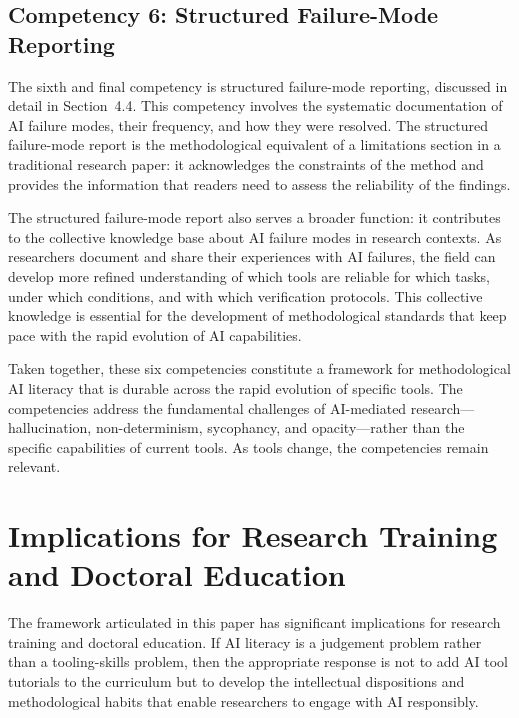 \documentclass[12pt, a4paper]{article}
\begin{document}
\subsection{Competency 6: Structured Failure-Mode Reporting}

The sixth and final competency is structured failure-mode reporting, discussed in detail in Section~4.4. This competency involves the systematic documentation of AI failure modes, their frequency, and how they were resolved. The structured failure-mode report is the methodological equivalent of a limitations section in a traditional research paper: it acknowledges the constraints of the method and provides the information that readers need to assess the reliability of the findings.

The structured failure-mode report also serves a broader function: it contributes to the collective knowledge base about AI failure modes in research contexts. As researchers document and share their experiences with AI failures, the field can develop more refined understanding of which tools are reliable for which tasks, under which conditions, and with which verification protocols. This collective knowledge is essential for the development of methodological standards that keep pace with the rapid evolution of AI capabilities.

Taken together, these six competencies constitute a framework for methodological AI literacy that is durable across the rapid evolution of specific tools. The competencies address the fundamental challenges of AI-mediated research---hallucination, non-determinism, sycophancy, and opacity---rather than the specific capabilities of current tools. As tools change, the competencies remain relevant.

\section{Implications for Research Training and Doctoral Education}

The framework articulated in this paper has significant implications for research training and doctoral education. If AI literacy is a judgement problem rather than a tooling-skills problem, then the appropriate response is not to add AI tool tutorials to the curriculum but to develop the intellectual dispositions and methodological habits that enable researchers to engage with AI responsibly.
\end{document}
